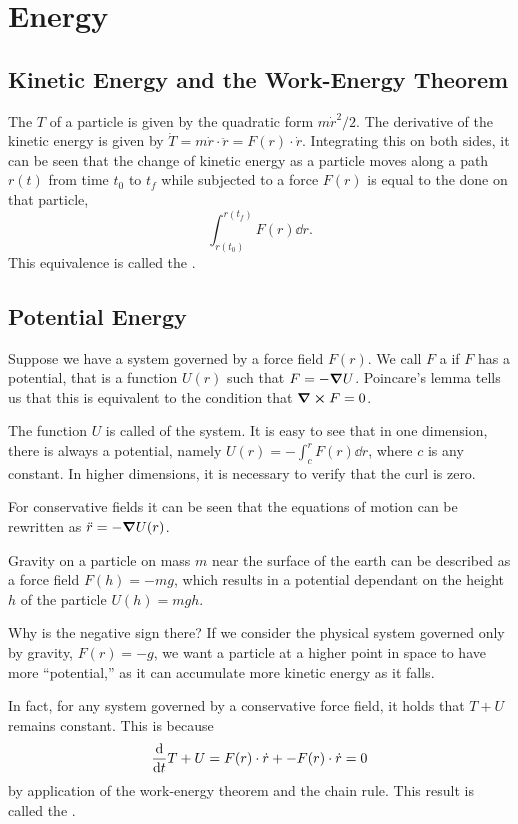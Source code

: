 \chapter{Energy}

\section{Kinetic Energy and the Work-Energy Theorem}

The  $T$ of a particle is given by the quadratic form $m\dot r^2/2$. The derivative of the kinetic energy is given by $\dot T = m\dot r \cdot \ddot r = F(r) \cdot \dot r$. Integrating this on both sides, it can be seen that the change of kinetic energy as a particle moves along a path $r(t)$ from time $t_0$ to $t_f$ while subjected to a force $F(r)$ is equal to the  done on that particle, \[ \int_{r(t_0)}^{r(t_f)} F(r) \dd{r}.\] This equivalence is called the .

\section{Potential Energy}

Suppose we have a system governed by a force field $F(r)$. We call $F$ a  if $F$ has a potential, that is a function $U(r)$ such that $F = -\grad U$. Poincare's lemma tells us that this is equivalent to the condition that $\curl F = 0$. 

The function $U$ is called  of the system. It is easy to see that in one dimension, there is always a potential, namely $U(r) = -\int_c^r F(r) \dd{r}$, where $c$ is any constant. In higher dimensions, it is necessary to verify that the curl is zero. 

For conservative fields it can be seen that the equations of motion can be rewritten as $\ddot r = - \grad U(r)$. 

\begin{example}
    Gravity on a particle on mass $m$ near the surface of the earth can be described as a force field $F(h) = -mg$, which results in a potential dependant on the height $h$ of the particle $U(h) = mgh$.
\end{example}

Why is the negative sign there? If we consider the physical system governed only by gravity, $F(r) = -g$, we want a particle at a higher point in space to have more ``potential,'' as it can accumulate more kinetic energy as it falls.

In fact, for any system governed by a conservative force field, it holds that $T + U$ remains constant. This is because \[\dv{t} T + U = F(r) \cdot \dot r + -F(r) \cdot \dot r = 0 \] by application of the work-energy theorem and the chain rule. This result is called the .

